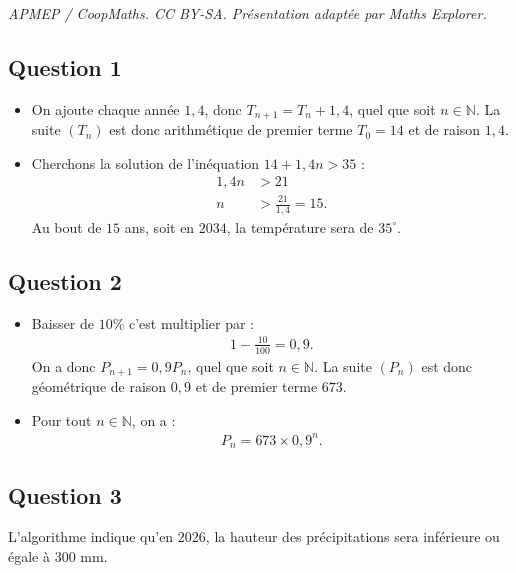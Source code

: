 \documentclass[10pt]{article}
\begin{document}
\noindent\textit{APMEP / CoopMaths. CC BY-SA. Présentation adaptée par Maths Explorer.}\par\medskip
\subsection*{Question 1}
	
	\begin{itemize}
		\item[a)] On ajoute chaque année $1,4$, donc $T_{n+1} = T_n + 1,4$, quel que soit $n \in \mathbb{N}$. La suite $(T_n)$ est donc arithmétique de premier terme $T_0 = 14$ et de raison $1,4$.
		\item[b)] Cherchons la solution de l'inéquation $14 + 1,4n > 35$ :
		\begin{align*}
			1,4n &> 21 \\
			n &> \frac{21}{1,4} = 15.
		\end{align*}
		Au bout de $15$ ans, soit en $2034$, la température sera de $35^\circ$.
	\end{itemize}
	
	\subsection*{Question 2}
	
	\begin{itemize}
		\item[a)] Baisser de $10\%$ c'est multiplier par :
		\begin{align*}
			1 - \frac{10}{100} = 0,9.
		\end{align*}
		On a donc $P_{n+1} = 0,9 P_n$, quel que soit $n \in \mathbb{N}$. La suite $(P_n)$ est donc géométrique de raison $0,9$ et de premier terme $673$.
		\item[b)] Pour tout $n \in \mathbb{N}$, on a :
		\begin{align*}
			P_n = 673 \times 0,9^n.
		\end{align*}
	\end{itemize}
	
	\subsection*{Question 3}
	
	L'algorithme indique qu'en $2026$, la hauteur des précipitations sera inférieure ou égale à $300$ mm.
\end{document}
